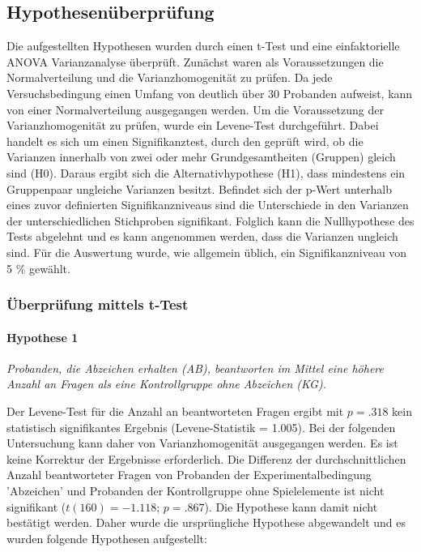 \subsection{Hypothesenüberprüfung}\label{hypo}
Die aufgestellten Hypothesen wurden durch einen t-Test und eine einfaktorielle  ANOVA  Varianzanalyse überprüft. Zunächst waren als Voraussetzungen die Normalverteilung und die Varianzhomogenität zu prüfen. Da jede Versuchsbedingung einen Umfang von deutlich über 30 Probanden aufweist, kann von einer Normalverteilung ausgegangen werden. Um die Voraussetzung der Varianzhomogenität zu prüfen, wurde ein Levene-Test durchgeführt. Dabei handelt es sich um einen Signifikanztest, durch den geprüft wird, ob die Varianzen innerhalb von zwei oder mehr Grundgesamtheiten (Gruppen) gleich sind (H0). Daraus ergibt sich die Alternativhypothese (H1), dass mindestens ein Gruppenpaar ungleiche Varianzen besitzt. Befindet sich der p-Wert unterhalb  eines zuvor definierten Signifikanzniveaus sind die Unterschiede in den Varianzen der unterschiedlichen Stichproben signifikant. Folglich kann die Nullhypothese des Tests abgelehnt und es kann angenommen werden, dass die Varianzen ungleich sind. Für die Auswertung wurde, wie allgemein üblich, ein Signifikanzniveau von 5 \% gewählt.

\subsubsection{Überprüfung mittels t-Test}

\paragraph{Hypothese 1 }
\begin{center}
    \textit{Probanden, die Abzeichen erhalten (AB), beantworten im Mittel eine höhere Anzahl an Fragen als eine Kontrollgruppe ohne Abzeichen (KG).} 
\end{center}

Der Levene-Test für die Anzahl an beantworteten Fragen ergibt mit $p = .318$ kein  statistisch  signifikantes  Ergebnis (Levene-Statistik = 1.005). Bei der folgenden Untersuchung kann daher von Varianzhomogenität ausgegangen werden. Es ist keine Korrektur der Ergebnisse erforderlich. Die Differenz der durchschnittlichen Anzahl beantworteter Fragen von Probanden der Experimentalbedingung 'Abzeichen' und Probanden der Kontrollgruppe ohne Spielelemente ist nicht signifikant ($t(160) = -1.118$; $p = .867$). Die Hypothese kann damit nicht bestätigt werden. Daher wurde die ursprüngliche Hypothese abgewandelt und es wurden folgende Hypothesen aufgestellt:


